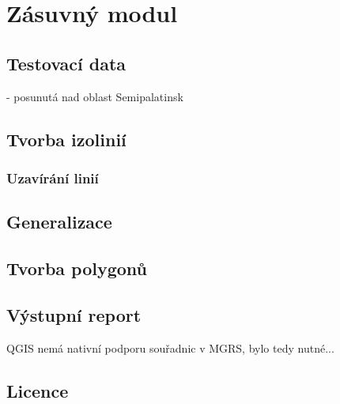 \chapter{Zásuvný modul}
\label{4-plugin}

\section{Testovací data}
- posunutá nad oblast Semipalatinsk


\section{Tvorba izolinií}

\subsection{Uzavírání linií}

\section{Generalizace}

\section{Tvorba polygonů}

\section{Výstupní report}
QGIS nemá nativní podporu souřadnic v MGRS, bylo tedy nutné...

\section{Licence}